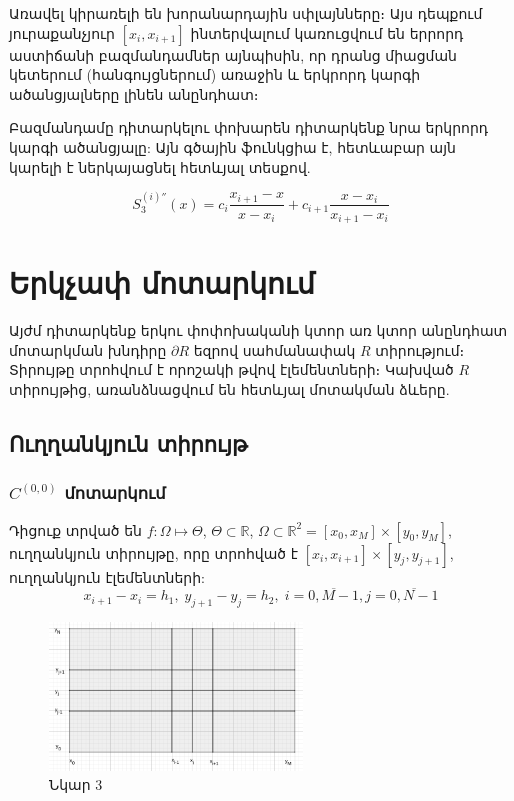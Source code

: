 \documentclass[fleqn, bachelor,subf,12pt,notitlepage]{disser}
\begin{document}
Առավել կիրառելի են խորանարդային սփլայնները։ Այս դեպքում յուրաքանչյուր $\left[x_{i}, x_{i+1}\right]$ ինտերվալում կառուցվում են երրորդ աստիճանի բազմանդամներ այնպիսին, որ դրանց միացման կետերում (հանգույցներում) առաջին և երկրորդ կարգի ածանցյալները լինեն անընդհատ։ 

Բազմանդամը դիտարկելու փոխարեն դիտարկենք նրա երկրորդ կարգի ածանցյալը: Այն գծային ֆունկցիա է, հետևաբար այն կարելի է ներկայացնել հետևյալ տեսքով.

$$ S^{(i)''}_3(x)=c_{i}\dfrac{x_{i+1}-x}{x-x_{i}}+c_{i+1}\dfrac{x-x_{i}}{x_{i+1}-x_{i}}$$



\newpage
\section*{Երկչափ մոտարկում}

Այժմ դիտարկենք երկու փոփոխականի կտոր առ կտոր անընդհատ մոտարկման խնդիրը $\partial R$ եզրով սահմանափակ $R$ տիրությում։ Տիրույթը տրոհվում է որոշակի թվով էլեմենտների։ Կախված $R$ տիրույթից, առանձնացվում են հետևյալ մոտակման ձևերը.

\subsection*{Ուղղանկյուն տիրույթ}
\subsubsection*{$C^{(0,0)}$ մոտարկում}

Դիցուք տրված են $f:\Omega\mapsto \Theta$,  $\Theta \subset \mathbb{R}$, $\Omega \subset \mathbb{R}^{2} = \left[x_{0}, x_{M}\right] \times \left[y_{0}, y_{M}\right]$,  ուղղանկյուն տիրույթը, որը տրոհված է $\left[x_{i}, x_{i+1}\right] \times \left[y_{j}, y_{j+1}\right]$, ուղղանկյուն էլեմենտների:
$$x_{i+1}-x_{i}=h_{1}, \; y_{j+1}-y_{j}=h_{2}, \; i=\overline{0, M-1}, j=\overline{0, N-1}$$

\begin{figure}[h!]
\centering
\includegraphics[width=0.6\textwidth]{images/two_var_linear}
\captionsetup{labelformat=empty}
\caption{\hfill Նկար 3}
\end{figure}
\end{document}
